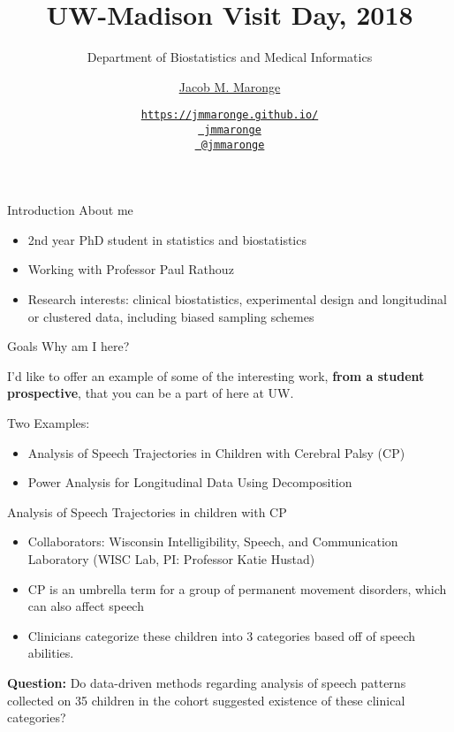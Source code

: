 \documentclass[12pt,t]{beamer}
\title{	UW-Madison Visit Day, 2018}
\subtitle{Department of Biostatistics and Medical Informatics}
\author{\href{https://jmmaronge.github.io/}{Jacob M. Maronge}}
\institute{\href{https://www.stat.wisc.edu/}{Department of Statistics \\ Department of Biostatistics and Medical Informatics} \\[4pt] \href{http://www.wisc.edu}{University of Wisconsin{\textendash}Madison}}
\date{\href{https://jmmaronge.github.io/}{\tt \scriptsize https://jmmaronge.github.io/}
\\[-4pt]
\href{https://github.com/jmmaronge}{\tt \scriptsize \faGithub \ jmmaronge}
\\[-4pt]
\href{https://twitter.com/jmmaronge}{\tt \scriptsize \faTwitter \ @jmmaronge}
}
\newcommand{\subt}[1]{{\footnotesize \color{subtitle} {#1}}}
\begin{document}
{
\frame{
  \titlepage
  
}
}
\begin{frame}{Introduction}
\subt{About me}
 
\bigskip
\begin{itemize}
\item 2nd year PhD student in statistics and biostatistics
\item Working with Professor Paul Rathouz
\item  Research interests: clinical biostatistics, experimental design and longitudinal or clustered data, including biased sampling schemes
\end{itemize}


\end{frame}

\begin{frame}{Goals}
\subt{Why am I here?}
 
\bigskip

I'd like to offer an example of some of the interesting work, \textbf{from a student prospective}, that you can be a part of here at UW.
\bigskip

Two Examples:
\begin{itemize}
\item Analysis of Speech Trajectories in Children with Cerebral Palsy (CP)
\item Power Analysis for Longitudinal Data Using Decomposition
\end{itemize}


\end{frame}

\begin{frame}{Analysis of Speech Trajectories}
\subt{in children with CP}
\bigskip

\begin{itemize}
\item Collaborators: Wisconsin Intelligibility, Speech, and Communication Laboratory (WISC Lab, PI: Professor Katie Hustad)
\item CP is an umbrella term for a group of permanent movement disorders, which can also affect speech
\item Clinicians categorize these children into 3 categories based off of speech abilities. 
\end{itemize}

\textbf{\color{uwred}Question:} Do data-driven methods regarding analysis of speech patterns collected on 35 children in the cohort suggested existence of these clinical categories? 

\end{frame}
\end{document}
